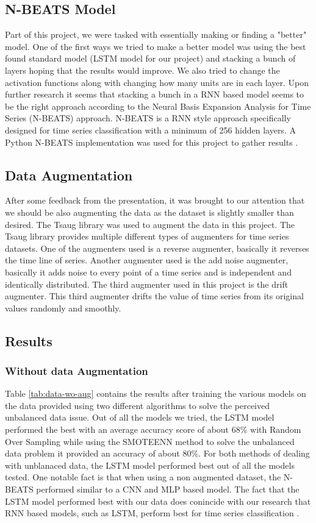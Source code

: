 \documentclass[conference]{IEEEtran}
\begin{document}
\subsection{N-BEATS Model}
Part of this project, we were tasked with essentially making or finding a "better" model. One of the first ways we tried to make a better model was using the best found standard model (LSTM model for our project) and stacking a bunch of layers hoping that the results would improve. We also tried to change the activation functions along with changing how many units are in each layer. Upon further research it seems that stacking a bunch in a RNN based model seems to be the right approach according to the Neural Basis Expansion Analysis for Time Series (N-BEATS) \cite{nbeats} approach. N-BEATS is a RNN style approach specifically designed for time series classification with a minimum of 256 hidden layers. A Python N-BEATS implementation was used for this project to gather results \cite{nbeats-python}.
\subsection{Data Augmentation}
After some feedback from the presentation, it was brought to our attention that we should be also augmenting the data as the dataset is slightly smaller than desired. The Tsaug \cite{b3} library was used to augment the data in this project. The Tsaug library provides multiple different types of augmenters for time series datasets. One of the augmenters used is a reverse augmenter, basically it reverses the time line of series. Another augmenter used is the add noise augmenter, basically it adds noise to every point of a time series and is independent and identically distributed. The third augmenter used in this project is the drift augmenter. This third augmenter drifts the value of time series from its original values randomly and smoothly.
\subsection{Results}
\subsubsection{Without data Augmentation}
Table \ref{tab:data-wo-aug} contains the results after training the various models on the data provided using two different algorithms to solve the perceived unbalanced data issue. Out of all the models we tried, the LSTM model performed the best with an average accuracy score of about 68\% with Random Over Sampling while using the SMOTEENN method to solve the unbalanced data problem it provided an accuracy of about 80\%. For both methods of dealing with unblanaced data, the LSTM model performed best out of all the models tested. One notable fact is that when using a non augmented dataset, the N-BEATS performed similar to a CNN and MLP based model. The fact that the LSTM model performed best with our data does conincide with our research that RNN based models, such as LSTM, perform best for time series classification \cite{lstm-article}.
\end{document}
